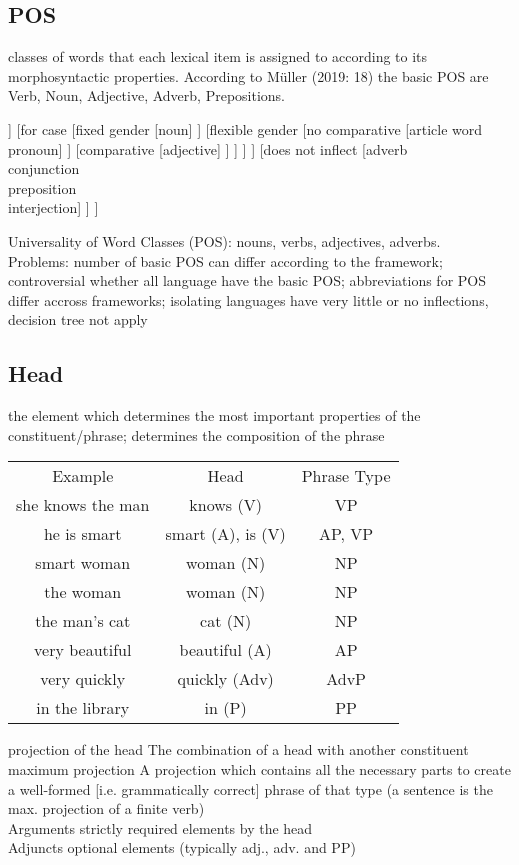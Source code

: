 \subsection*{POS}
{\tiny classes of words that each lexical item is assigned to according to its morphosyntactic properties. According to Müller (2019: 18) the basic POS are Verb, Noun, Adjective, Adverb, Prepositions.\\
\begin{forest}
[POS
	[inflects
		[for tense
			[verb]
		]
		[for case
			[fixed gender
				[noun]
			]
			[flexible gender
				[no comparative
					[article word\\
					pronoun]
				]
				[comparative
					[adjective]
				]
			]		
		]
	]
	[does not inflect
		[adverb\\
		conjunction\\
		preposition\\
		interjection]
	]
]
\end{forest}
}
\scriptsize{Universality of Word Classes (POS)}: {\tiny nouns, verbs, adjectives, adverbs}.\\
\scriptsize{Problems}: {\tiny number of basic POS can differ according to the framework; controversial whether all language have the basic POS; abbreviations for POS differ accross frameworks; isolating languages have very little or no inflections, decision tree not apply}
\subsection*{Head}
{\tiny the element which
determines the most important properties of the
constituent/phrase; determines the composition of the phrase}\\
{\tiny
\begin{tabular}{ c c c }
 Example & Head & Phrase Type \\ 
 she knows the man & knows (V) & VP \\  
 he is smart & smart (A), is (V) & AP, VP   \\
 smart woman & woman (N) & NP \\
 the woman & woman (N) & NP \\
 the man’s cat & cat (N) & NP \\
 very beautiful & beautiful (A) & AP  \\
 very quickly & quickly (Adv) & AdvP \\
 in the library & in (P) & PP\\
\end{tabular}
}
\scriptsize{projection of the head} {\tiny The combination of a head with another constituent }\\
\scriptsize{maximum projection} {\tiny A projection which contains all the necessary parts to create a well-formed [i.e. grammatically correct] phrase of that type (a sentence is the max. projection of a finite verb)}\\
\scriptsize{Arguments} {\tiny strictly required elements by the head}\\
\scriptsize{Adjuncts} {\tiny optional elements (typically adj., adv. and PP)}
